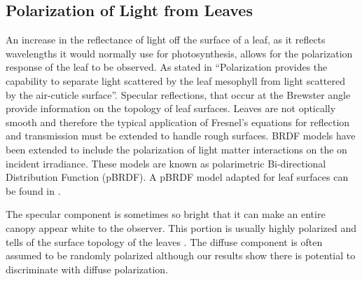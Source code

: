 \subsection{Polarization of Light from Leaves}

An increase in the reflectance of light off the surface of a leaf, as it reflects wavelengths it would normally use for photosynthesis, allows for the polarization response of the leaf to be observed.  As stated in \cite{photonvegetation} “Polarization provides the capability to separate light scattered by the leaf mesophyll from light scattered by the air-cuticle surface”.  Specular reflections, that occur at the Brewster angle provide information on the topology of leaf surfaces.  Leaves are not optically smooth and therefore the typical application of Fresnel’s equations for reflection and transmission must be extended to handle rough surfaces. BRDF models have been extended to include the polarization of light matter interactions on the on incident irradiance.  These models are known as polarimetric Bi-directional Distribution Function (pBRDF).  A pBRDF model adapted for leaf surfaces can be found in \cite{photonvegetation}.

The specular component is sometimes so bright that it can make an entire canopy appear white to the observer.  This portion is usually highly polarized and tells of the surface topology of the leaves \cite{vanderbilt}.  The diffuse component is often assumed to be randomly polarized although our results show there is potential to discriminate with diffuse polarization.
